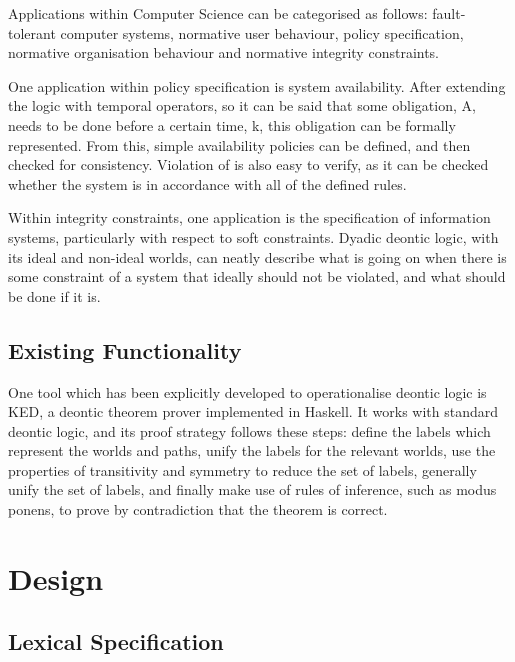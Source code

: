 \documentclass{l4proj}
\begin{document}
Applications within Computer Science can be categorised as follows\cite{meyer93applications}: fault-tolerant computer systems, normative user behaviour, policy specification, normative organisation behaviour and normative integrity constraints. %

One application within policy specification is system availability\cite{brunel04deontic}. After extending the logic with temporal operators, so it can be said that some obligation, A, needs to be done before a certain time, k, this obligation can be formally represented. From this, simple availability policies can be defined, and then checked for consistency. Violation of is also easy to verify, as it can be checked whether the system is in accordance with all of the defined rules. 

Within integrity constraints, one application is the specification of information systems\cite{infosystems}, particularly with respect to soft constraints. Dyadic deontic logic, with its ideal and non-ideal worlds, can neatly describe what is going on when there is some constraint of a system that ideally should not be violated, and what should be done if it is. 

\section{Existing Functionality}%
One tool which has been explicitly developed to operationalise deontic logic is KED\cite{KED}, a deontic theorem prover implemented in Haskell. It works with standard deontic logic, and its proof strategy follows these steps: define the labels which represent the worlds and paths, unify the labels for the relevant worlds, use the properties of transitivity and symmetry to reduce the set of labels, generally unify the set of labels, and finally make use of rules of inference, such as modus ponens, to prove by contradiction that the theorem is correct. 

\chapter{Design}

\section{Lexical Specification}
\end{document}
